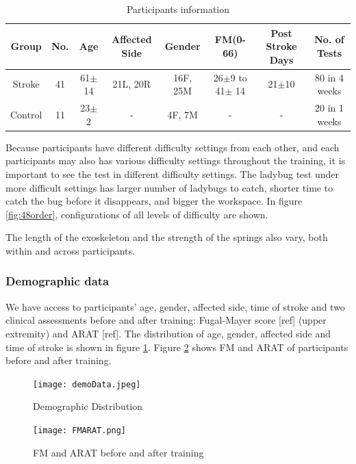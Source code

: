 \begin{table}[b]
	\begin{tabular}{c c c c c c c c}
	\hline
	Group & No. & Age & Affected Side & Gender & FM(0-66) & Post Stroke Days & No. of Tests\\
	\hline
	Stroke & 41 & 61$\pm$14 & 21L, 20R & 16F, 25M & 26$\pm$9 to 41$\pm$ 14 & 21$\pm$10 & 80 in 4 weeks \\ 
	Control & 11 & 23$\pm$2 & - & 4F, 7M & - & - & 20 in 1 weeks \\
	\hline
	\end{tabular}
	\caption{Participants information}
	\label{tab:demog}
\end{table}

Because participants have different difficulty settings from each other, and each participants may also has various difficulty settings throughout the training, it is important to see the test in different difficulty settings. 
The ladybug test under more difficult settings has larger number of ladybugs to catch, shorter time to catch the bug before it disappears, and bigger the workspace. 
In figure \ref{fig:48order}, configurations of all levels of difficulty are shown. 

The length of the exoskeleton and the strength of the springs also vary, both within and across participants.

\subsubsection{Demographic data}

We have access to participants' age, gender, affected side, time of stroke and two clinical assessments before and after training: Fugal-Mayer score [ref] (upper extremity) and ARAT [ref]. The distribution of age, gender, affected side and time of stroke is shown in figure \ref{fig:demoData}. Figure \ref{fig:FMARAT} shows FM and ARAT of participants before and after training.

\begin{figure} %
	\texttt{[image: demoData.jpeg]}
	\centering
	\caption{Demographic Distribution}
	\medskip
	\small 
	\label{fig:demoData}
\end{figure}

\begin{figure} %
	\texttt{[image: FMARAT.png]}
	\centering
	\caption{FM and ARAT before and after training}
	\medskip
	\small 
	\label{fig:FMARAT}
\end{figure}


